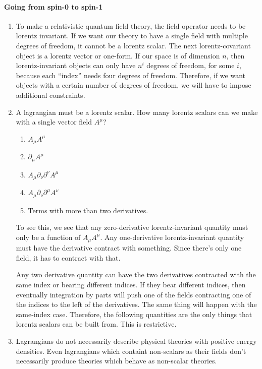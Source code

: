 \documentclass{article}
\begin{document}
\paragraph{Going from spin-0 to spin-1}
\begin{enumerate}
\item To make a relativistic quantum field theory, the field operator
	needs to be lorentz invariant.
If we want our theory to have a single field with multiple degrees of 	
	freedom, it cannot be a lorentz scalar.
The next lorentz-covariant object is a lorentz vector or one-form.
If our space is of dimension $n$, then lorentz-invariant objects
	can only have $n^i$ degrees of freedom, for some $i$, because
	each ``index'' needs four degrees of freedom.
Therefore, if we want objects with a certain number of degrees of freedom,
	we will have to impose additional constraints.
\item A lagrangian must be a lorentz scalar.
How many lorentz scalars can we make with a single vector field $A^\mu$?
	\begin{enumerate}
	\item $A_\mu A^\mu$
	\item $\partial_\mu A^\mu$
	\item $A_\mu \partial_\nu \partial^\nu A^\mu$
	\item $A_\mu \partial_\nu \partial^\mu A^\nu$
	\item Terms with more than two derivatives.
	\end{enumerate}
To see this, we see that any zero-derivative lorentz-invariant quantity
	must only be a function of $A_\mu A^\mu$.
Any one-derivative lorentz-invariant quantity must have the derivative
	contract with something.
Since there's only one field, it has to contract with that.

Any two derivative quantity can have the two derivatives contracted
	with the same index or bearing different indices.
If they bear different indices, then eventually integration by parts
	will push one of the fields contracting one of the indices to the
	left of the derivatives.
The same thing will happen with the same-index case.
Therefore, the following quantities are the only things that lorentz
	scalars can be built from.
This is restrictive.

\item Lagrangians do not necessarily describe physical theories with 
	positive energy densities.
Even lagrangians which containt non-scalars as their fields don't
	necessarily produce theories which behave as non-scalar theories.


\end{enumerate}
\end{document}
